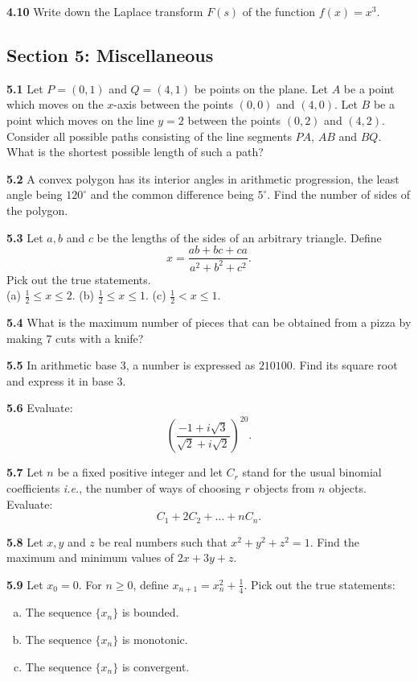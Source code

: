 \documentclass[11pt,a4paper]{article}
\newcommand{\examsec}[1]{%
  \subsection*{#1}
  \vspace{-2pt}
}
\newcommand{\qitem}[1]{\par\medskip\noindent\textbf{#1}\hspace{0.5em}}
\begin{document}
\qitem{4.10} Write down the Laplace transform $F(s)$ of the function $f(x) = x^3$.

\examsec{Section 5: Miscellaneous}

\qitem{5.1} Let $P = (0, 1)$ and $Q = (4, 1)$ be points on the plane. Let $A$ be a point which moves on the $x$-axis between the points $(0, 0)$ and $(4, 0)$. Let $B$ be a point which moves on the line $y = 2$ between the points $(0, 2)$ and $(4, 2)$. Consider all possible paths consisting of the line segments $PA$, $AB$ and $BQ$. What is the shortest possible length of such a path?

\qitem{5.2} A convex polygon has its interior angles in arithmetic progression, the least angle being $120^\circ$ and the common difference being $5^\circ$. Find the number of sides of the polygon.

\qitem{5.3} Let $a, b$ and $c$ be the lengths of the sides of an arbitrary triangle. Define
\[
  x = \frac{ab + bc + ca}{a^2 + b^2 + c^2}.
\]
Pick out the true statements.\\
(a) $\frac{1}{2} \le x \le 2$. \qquad (b) $\frac{1}{2} \le x \le 1$. \qquad (c) $\frac{1}{2} < x \le 1$.

\qitem{5.4} What is the maximum number of pieces that can be obtained from a pizza by making $7$ cuts with a knife?

\qitem{5.5} In arithmetic base $3$, a number is expressed as $210100$. Find its square root and express it in base $3$.

\qitem{5.6} Evaluate:
\[
  \left(\frac{-1 + i\sqrt{3}}{\sqrt{2} + i\sqrt{2}}\right)^{20}.
\]

\qitem{5.7} Let $n$ be a fixed positive integer and let $C_r$ stand for the usual binomial coefficients \emph{i.e.}, the number of ways of choosing $r$ objects from $n$ objects. Evaluate:
\[
  C_1 + 2C_2 + \dots + nC_n.
\]

\qitem{5.8} Let $x, y$ and $z$ be real numbers such that $x^2 + y^2 + z^2 = 1$. Find the maximum and minimum values of $2x + 3y + z$.

\qitem{5.9} Let $x_0 = 0$. For $n \ge 0$, define $x_{n+1} = x_n^2 + \frac{1}{4}$. Pick out the true statements:
\begin{enumerate}[(a)]
  \item The sequence $\{x_n\}$ is bounded.
  \item The sequence $\{x_n\}$ is monotonic.
  \item The sequence $\{x_n\}$ is convergent.
\end{enumerate}
\end{document}

